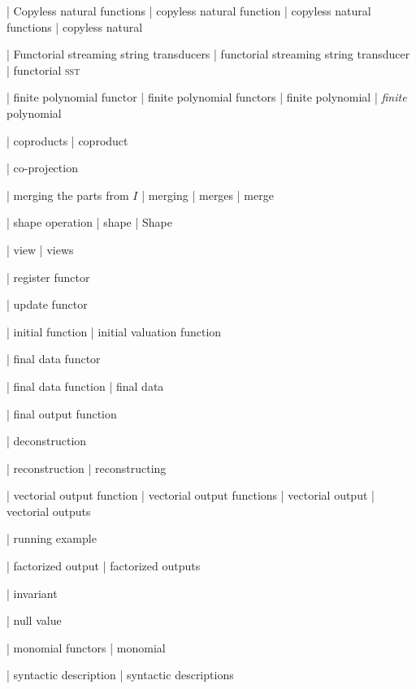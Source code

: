 | Copyless natural functions
| copyless natural function
| copyless natural functions
| copyless natural

| Functorial streaming string transducers
| functorial streaming string transducer
| functorial \textsc {sst}

| finite polynomial functor
| finite polynomial functors
| finite polynomial
| \emph {finite} polynomial

| coproducts
| coproduct

| co-projection

| merging the parts from $I$
| merging
| merges
| merge

| shape operation
| shape
| Shape

| view
| views

| register functor

| update functor

| initial function
| initial valuation function

| final data functor

| final data function
| final data

| final output function

| deconstruction

| reconstruction
| reconstructing

| vectorial output function
| vectorial output functions
| vectorial output
| vectorial outputs

| running example

| factorized output
| factorized outputs

| invariant

| null value

 | monomial functors
 | monomial

 | syntactic description
 | syntactic descriptions
